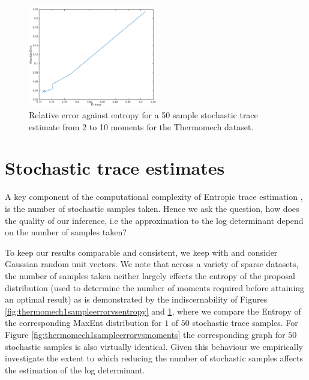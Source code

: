 \documentclass[journal]{IEEEtran}
\begin{document}
	\begin{figure}[t]
		\centering 
		\includegraphics[width=0.5\textwidth]{thermo50smp-cropped}
		\caption{Relative error against entropy for a 50 sample stochastic trace estimate from 2 to 10 moments for the Thermomech dataset.}
		\label{fig:thermomech30sampleerrorvsentropy}
	\end{figure}
	
	\section{Stochastic trace estimates}
	A key component of the computational complexity of Entropic trace estimation \cite{ete}, is the number of stochastic samples taken. Hence we ask the question, how does the quality of our inference, i.e the approximation to the log determinant depend on the number of samples taken?
	
	To keep our results comparable and consistent, we keep with \cite{ete,bild} and consider Gaussian random unit vectors. We note that across a variety of sparse datasets, the number of samples taken neither largely effects the entropy of the proposal distribution (used to determine the number of moments required before attaining an optimal result) as is demonstrated by the indiscernability of Figures \ref{fig:thermomech1sampleerrorvsentropy} and \ref{fig:thermomech30sampleerrorvsentropy}, where we compare the Entropy of the corresponding MaxEnt distribution for $1$ of $50$ stochastic trace samples. For Figure \ref{fig:thermomech1sampleerrorvsmoments} the corresponding graph for $50$ stochastic samples is also virtually identical. Given this behaviour we empirically investigate the extent to which reducing the number of stochastic samples affects the estimation of the log determinant.
	
	
\end{document}
